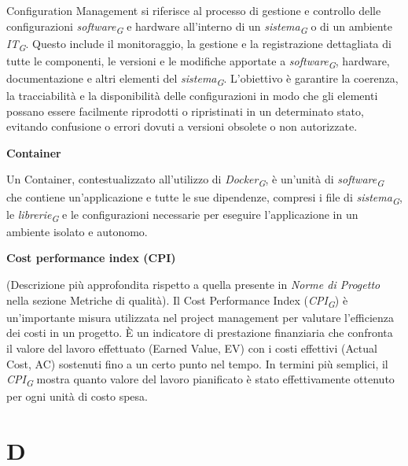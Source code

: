 \documentclass{article}
\begin{document}
Configuration Management si riferisce al processo di gestione e controllo delle configurazioni \textit{software}\textsubscript{\textit{G}} e hardware all'interno di un \textit{sistema}\textsubscript{\textit{G}} o di un ambiente \textit{IT}\textsubscript{\textit{G}}. Questo include il monitoraggio, la gestione e la registrazione dettagliata di tutte le componenti, le versioni e le modifiche apportate a \textit{software}\textsubscript{\textit{G}}, hardware, documentazione e altri elementi del \textit{sistema}\textsubscript{\textit{G}}. L'obiettivo è garantire la coerenza, la tracciabilità e la disponibilità delle configurazioni in modo che gli elementi possano essere facilmente riprodotti o ripristinati in un determinato stato, evitando confusione o errori dovuti a versioni obsolete o non autorizzate.

\vspace{0.4cm}

\textbf{Container}

\vspace{0.1cm}

Un Container, contestualizzato all’utilizzo di \textit{Docker}\textsubscript{\textit{G}}, è un'unità di \textit{software}\textsubscript{\textit{G}} che contiene un'applicazione e tutte le sue dipendenze, compresi i file di \textit{sistema}\textsubscript{\textit{G}}, le \textit{librerie}\textsubscript{\textit{G}} e le configurazioni necessarie per eseguire l'applicazione in un ambiente isolato e autonomo.

\vspace{0.4cm}

\textbf{Cost performance index (CPI)}

\vspace{0.1cm}

(Descrizione più approfondita rispetto a quella presente in \textit{Norme di Progetto} nella sezione Metriche di qualità). Il Cost Performance Index (\textit{CPI}\textsubscript{\textit{G}}) è un'importante misura utilizzata nel project management per valutare l'efficienza dei costi in un progetto. È un indicatore di prestazione finanziaria che confronta il valore del lavoro effettuato (Earned Value, EV) con i costi effettivi (Actual Cost, AC) sostenuti fino a un certo punto nel tempo. In termini più semplici, il \textit{CPI}\textsubscript{\textit{G}} mostra quanto valore del lavoro pianificato è stato effettivamente ottenuto per ogni unità di costo spesa.

\pagebreak
\section*{D}
{}
\end{document}
